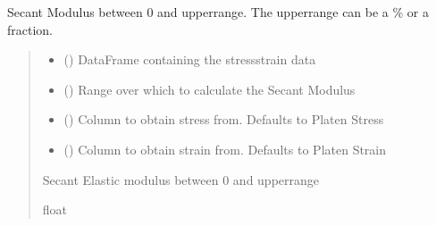 \documentclass[letterpaper,10pt,english]{sphinxmanual}
\begin{document}
\begin{fulllineitems}
\begin{fulllineitems}
\label{\detokenize{pyfdempp:pyfdempp.pyfdempp.Model.Esec_mod}}
\pysigstartsignatures
{}
\pysigstopsignatures
\sphinxAtStartPar
Secant Modulus between 0 and upperrange. The upperrange can be a \% or a fraction.
\begin{quote}\begin{description}
\begin{itemize}
\item {} 
\sphinxAtStartPar
{} () \textendash{} DataFrame containing the stress\sphinxhyphen{}strain data

\item {} 
\sphinxAtStartPar
{} () \textendash{} Range over which to calculate the Secant Modulus

\item {} 
\sphinxAtStartPar
{} () \textendash{} Column to obtain stress from. Defaults to Platen Stress

\item {} 
\sphinxAtStartPar
{} () \textendash{} Column to obtain strain from. Defaults to Platen Strain

\end{itemize}

\sphinxAtStartPar
Secant Elastic modulus between 0 and upperrange

\sphinxAtStartPar
float


\end{description}
\end{quote}
\end{fulllineitems}
\end{fulllineitems}
\end{document}
